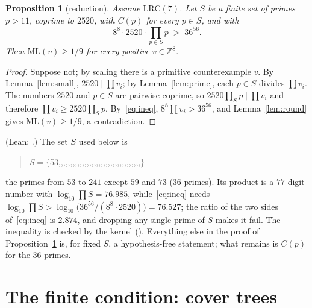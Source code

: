 \documentclass[11pt]{article}
\newtheorem{proposition}[theorem]{Proposition}
\theoremstyle{remark}
\newcommand{\ML}{\mathrm{ML}}
\newcommand{\Z}{\mathbb{Z}}
\begin{document}
\begin{proposition}[reduction]\label{prop:red}
Assume $\mathrm{LRC}(7)$. Let $S$ be a finite set of primes $p>11$, coprime to $2520$, with $C(p)$ for every $p\in S$, and with
\begin{equation}\label{eq:ineq}
8^8\cdot2520\cdot\prod_{p\in S}p\;>\;36^{56}.
\end{equation}
Then $\ML(v)\ge1/9$ for every positive $v\in\Z^8$.
\end{proposition}
\begin{proof}
Suppose not; by scaling there is a primitive counterexample $v$. By Lemma~\ref{lem:small}, $2520\mid\prod v_i$; by Lemma~\ref{lem:prime}, each $p\in S$ divides $\prod v_i$. The numbers $2520$ and $p\in S$ are pairwise coprime, so $2520\prod_Sp\mid\prod v_i$ and therefore $\prod v_i\ge2520\prod_S p$. By~\eqref{eq:ineq}, $8^8\prod v_i>36^{56}$, and Lemma~\ref{lem:round} gives $\ML(v)\ge1/9$, a contradiction.
\end{proof}
(Lean: .) The set $S$ used below is
\begin{quote}\small\raggedright
$S=\{$53,,,,,,,,,,,,,,,,,,,,,,,,,,,,,,,,,,,$\}$
\end{quote}
the primes from $53$ to $241$ except $59$ and $73$ ($36$ primes). Its product is a $77$-digit number with $\log_{10}\prod S=76.985$, while~\eqref{eq:ineq} needs $\log_{10}\prod S>\log_{10}\bigl(36^{56}/(8^8\cdot 2520)\bigr)=76.527$; the ratio of the two sides of~\eqref{eq:ineq} is $2.874$, and dropping any single prime of $S$ makes it fail. The inequality is checked by the kernel (). Everything else in the proof of Proposition~\ref{prop:red} is, for fixed $S$, a hypothesis-free statement; what remains is $C(p)$ for the $36$ primes.

\section{The finite condition: cover trees}\label{sec:cover}
\end{document}
